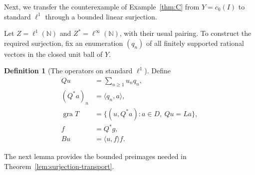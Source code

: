 \documentclass[11pt]{article}
\newcommand{\N}{\mathbb N}
\newcommand{\gra}{\operatorname{gra}}
\newcommand{\pair}[2]{\langle #1,#2\rangle}
\theoremstyle{definition}
\newtheorem{definition}{Definition}
\theoremstyle{remark}
\begin{document}
Next, we transfer the counterexample of Example~\ref{thm:C} from $Y=c_0(I)$ to standard $\ell^1$ through a bounded linear surjection.


Let $Z=\ell^1(\N)$ and $Z^*=\ell^\infty(\N)$, with their usual pairing. To construct the required surjection, fix an enumeration $(q_n)$ of all finitely supported rational vectors in the closed unit ball of $Y$.
\begin{definition}[The operators on standard $\ell^1$]
Define
\begin{equation}
\begin{aligned}
Qu&=\sum_{n\ge1}u_nq_n,\\
(Q^*a)_n&=\pair{q_n}{a},\\
\gra T&=\{(u,Q^*a):a\in D,\ Qu=La\},\\
f&=Q^*g,\\
Bu&=\pair{u}{f}f.
\end{aligned}
\label{eq:D10}
\end{equation}
\end{definition}
The next lemma provides the bounded preimages needed in Theorem~\ref{lem:surjection-transport}.
\end{document}
